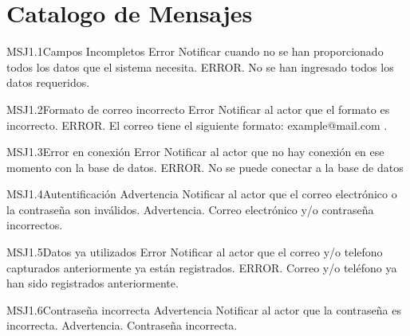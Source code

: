 \section{Catalogo de Mensajes}
	
	\begin{Message}{MSJ1.1}{Campos Incompletos}
		\MSGitem[Tipo:] Error	
		\MSGitem[Objetivo: ] Notificar cuando no se han proporcionado todos los datos que el sistema necesita.
		\MSGitem[Redacción: ] ERROR. No se han ingresado todos los datos requeridos.
	\end{Message}
	
	\begin{Message}{MSJ1.2}{Formato de correo incorrecto}
		\MSGitem[Tipo:] Error	
		\MSGitem[Objetivo: ] Notificar al actor que el formato es incorrecto.
		\MSGitem[Redacción: ] ERROR. El correo tiene el siguiente formato: example@mail.com .
	\end{Message}

	\begin{Message}{MSJ1.3}{Error en conexión}
		\MSGitem[Tipo:] Error	
		\MSGitem[Objetivo: ] Notificar al actor que no hay conexión en ese momento con la base de datos.
		\MSGitem[Redacción: ] ERROR. No se puede conectar a la base de datos
	\end{Message}
	
	\begin{Message}{MSJ1.4}{Autentificación}
		\MSGitem[Tipo:] Advertencia	
		\MSGitem[Objetivo: ] Notificar al actor que el correo electrónico o la contraseña son inválidos.
		\MSGitem[Redacción: ] Advertencia. Correo electrónico y/o contraseña incorrectos.
	\end{Message}
	
	\begin{Message}{MSJ1.5}{Datos ya utilizados}
		\MSGitem[Tipo:] Error
		\MSGitem[Objetivo: ] Notificar al actor que el correo y/o telefono capturados anteriormente ya están registrados.
		\MSGitem[Redacción: ] ERROR. Correo y/o teléfono ya han sido registrados anteriormente.
	\end{Message}
	
	\begin{Message}{MSJ1.6}{Contraseña incorrecta}
		\MSGitem[Tipo:] Advertencia	
		\MSGitem[Objetivo: ] Notificar al actor que la contraseña es incorrecta.
		\MSGitem[Redacción: ] Advertencia. Contraseña incorrecta.
	\end{Message}